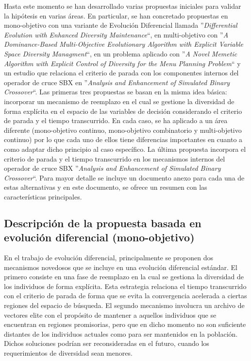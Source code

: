 
Hasta este momento se han desarrollado varias propuestas iniciales para validar la hipótesis en varias áreas.
%
En particular, se han concretado propuestas en mono-objetivo con una variante de Evolución Diferencial llamada 
''\textit{Differential Evolution with Enhanced Diversity Maintenance}``, en multi-objetivo con 
''\textit{A Dominance-Based Multi-Objective Evolutionary Algorithm with Explicit Variable Space Diversity Managment}``, 
en un problema aplicado con ''\textit{A Novel Memetic Algorithm with Explicit Control of Diversity for the Menu Planning Problem}`` 
y un estudio que relaciona el criterio de parada con los componentes internos del operador de cruce SBX en 
''\textit{Analysis and Enhancement of Simulated Binary Crossover}``.
%
Las primeras tres propuestas se basan en la misma idea básica: incorporar un mecanismo de reemplazo en el cual se 
gestione la diversidad de forma explícita en el espacio de las variables de decisión considerando el criterio de parada y el 
tiempo transcurrido.
%
En cada caso, se ha aplicado a un área diferente (mono-objetivo continuo, mono-objetivo combinatorio y multi-objetivo continuo)
por lo que cada uno de ellos tiene diferencias importantes en cuanto a como adaptar dicho principio al caso específico.
%
La última propuesta incorpora el criterio de parada y el tiempo transcurrido en los mecanismos internos del operador de 
cruce SBX ''\textit{Analysis and Enhancement of Simulated Binary Crossover}``.
%
Para mayor detalle se incluye un documento anexo para cada una de estas alternativas y en este documento, se ofrece
un resumen con las características principales.

\subsection{Descripción de la propuesta basada en evolución diferencial (mono-objetivo)}

En el trabajo de evolución diferencial, principalmente se proponen dos mecanismos novedosos que se incluye
en una evolución diferencial estándar.
%
El primero consiste en una fase de reemplazo en la cual se gestiona la diversidad de los individuos de forma explícita.
%
Esta estrategia relaciona el tiempo transcurrido con el criterio de parada de forma que se evita la convergencia acelerada 
a ciertas regiones del espacio de búsqueda.
%
El segundo mecanismo involucra un archivo de vectores elite con el propósito de mantener a aquellos individuos que 
se encuentran en regiones promisorias, pero que en dicho momento no son suficiente distantes de los individuos actuales como
para ser mantenidos en la población.
%
Dichos soluciones podrían ser reconsideradas en el futuro, cuando los requerimientos de diversidad sean menores.

